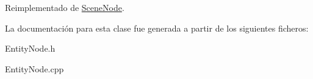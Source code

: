 Reimplementado de \hyperlink{classSceneNode}{Scene\+Node}.



La documentación para esta clase fue generada a partir de los siguientes ficheros\+:\begin{DoxyCompactItemize}
\item 
Entity\+Node.\+h\item 
Entity\+Node.\+cpp\end{DoxyCompactItemize}
